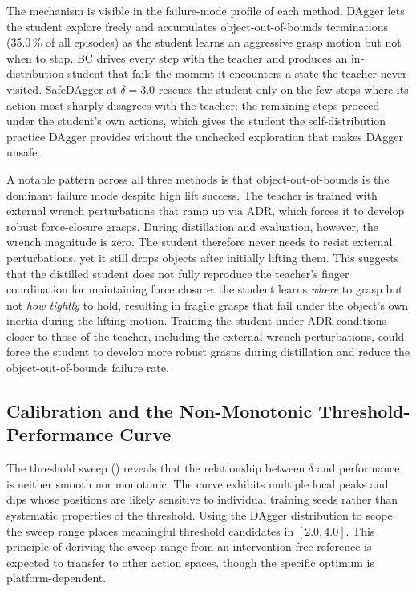 The mechanism is visible in the failure-mode profile of each method.
DAgger lets the student explore freely and accumulates object-out-of-bounds terminations (35.0\,\% of all episodes) as the student learns an aggressive grasp motion but not when to stop.
BC drives every step with the teacher and produces an in-distribution student that fails the moment it encounters a state the teacher never visited.
SafeDAgger at $\delta = 3.0$ rescues the student only on the few steps where its action most sharply disagrees with the teacher; the remaining steps proceed under the student's own actions, which gives the student the self-distribution practice DAgger provides without the unchecked exploration that makes DAgger unsafe.

A notable pattern across all three methods is that object-out-of-bounds is the dominant failure mode despite high lift success.
The teacher is trained with external wrench perturbations that ramp up via \ac{ADR}, which forces it to develop robust force-closure grasps.
During distillation and evaluation, however, the wrench magnitude is zero.
The student therefore never needs to resist external perturbations, yet it still drops objects after initially lifting them.
This suggests that the distilled student does not fully reproduce the teacher's finger coordination for maintaining force closure: the student learns \emph{where} to grasp but not \emph{how tightly} to hold, resulting in fragile grasps that fail under the object's own inertia during the lifting motion.
Training the student under \ac{ADR} conditions closer to those of the teacher, including the external wrench perturbations, could force the student to develop more robust grasps during distillation and reduce the object-out-of-bounds failure rate.

\subsection{Calibration and the Non-Monotonic Threshold-Performance Curve}%
\label{sec:impl_details}%

The threshold sweep () reveals that the relationship between $\delta$ and performance is neither smooth nor monotonic.
The curve exhibits multiple local peaks and dips whose positions are likely sensitive to individual training seeds rather than systematic properties of the threshold.
Using the DAgger distribution to scope the sweep range places meaningful threshold candidates in $[2.0, 4.0]$.
This principle of deriving the sweep range from an intervention-free reference is expected to transfer to other action spaces, though the specific optimum is platform-dependent.

